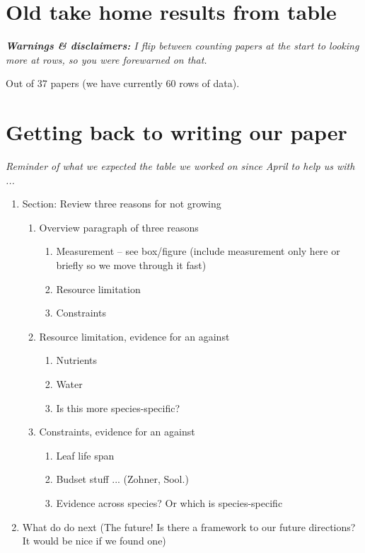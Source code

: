 \documentclass[11pt]{article}
\begin{document}
\clearpage

\section{Old take home results from table}

\emph{{\bf Warnings \& disclaimers:}
I flip between counting papers at the start to looking more at rows, so you were forewarned on that. }



Out of 37 papers (we have currently 60 rows of data).

\section{Getting back to writing our paper}

\emph{Reminder of what we expected the table we worked on since April to help us with ...}
\begin{enumerate}
\item Section: Review three reasons for not growing 
\begin{enumerate} 
\item Overview paragraph of three reasons
\begin{enumerate} 
\item Measurement -- see box/figure  (include measurement only here or briefly so we move through it fast)
\item Resource limitation
\item Constraints
\end{enumerate}
\item Resource limitation, evidence for an against 
\begin{enumerate}
\item Nutrients
\item Water
\item Is this more species-specific?
\end{enumerate}
\item Constraints, evidence for an against 
\begin{enumerate}
\item Leaf life span
\item Budset stuff ... (Zohner, Sool.)
\item Evidence across species? Or which is species-specific
\end{enumerate}
\end{enumerate}
\item What do do next (The future! Is there a framework to our future directions? It would be nice if we found one) 
\end{enumerate}
\end{document}
